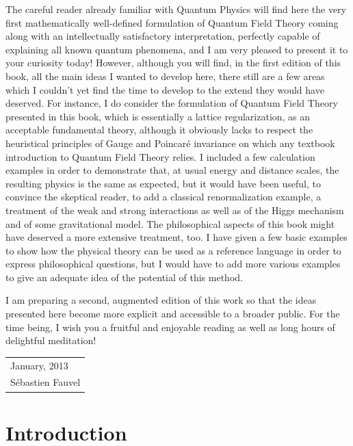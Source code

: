 \documentclass[10pt,a4paper,twoside,openany]{book}
\begin{document}
The careful reader already familiar with Quantum Physics will find here the very first mathematically well-defined formulation of Quantum Field Theory coming along with an intellectually satisfactory interpretation, perfectly capable of explaining all known quantum phenomena, and I am very pleased to present it to your curiosity today! However, although you will find, in the first edition of this book, all the main ideas I wanted to develop here, there still are a few areas which I couldn't yet find the time to develop to the extend they would have deserved. For instance, I do consider the formulation of Quantum Field Theory presented in this book, which is essentially a lattice regularization, as an acceptable fundamental theory, although it obviously lacks to respect the heuristical principles of Gauge and Poincaré invariance on which any textbook introduction to Quantum Field Theory relies. I included a few calculation examples in order to demonstrate that, at usual energy and distance scales, the resulting physics is the same as expected, but it would have been useful, to convince the skeptical reader, to add a classical renormalization example, a treatment of the weak and strong interactions as well as of the Higgs mechanism and of some gravitational model. The philosophical aspects of this book might have deserved a more extensive treatment, too. I have given a few basic examples to show how the physical theory can be used as a reference language in order to express philosophical questions, but I would have to add more various examples to give an adequate idea of the potential of this method.

I am preparing a second, augmented edition of this work so that the ideas presented here become more explicit and accessible to a broader public. For the time being, I wish you a fruitful and enjoyable reading as well as long hours of delightful meditation!

\begin{flushright}
\begin{tabular}{l}
January, 2013\\
Sébastien Fauvel
\end{tabular}
\end{flushright}

\cleardoublepage
\tableofcontents

\chapter{Introduction}
\end{document}
